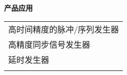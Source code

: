 \vspace{0.4cm}
\noindent\sanhao\textbf{产品应用}
\vspace{0.3cm}
\song
\begin{table}[H]
{}
\begin{tabular}{m{13.5cm}}
\rowcolor{gray!20}
\arrayrulecolor{tabcolor_top}\toprule[1.8pt]
高时间精度的脉冲/序列发生器\\\arrayrulecolor{tabcolor}\midrule[1.2pt]
高精度同步信号发生器 \\\arrayrulecolor{tabcolor}\midrule[1.2pt]
延时发生器\\\arrayrulecolor{tabcolor}\midrule[1.2pt]
\arrayrulecolor{tabcolor_top}\bottomrule[1.8pt]
\end{tabular}
\end{table}

\newpage
\qquad

